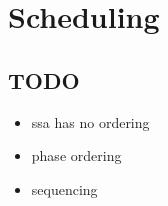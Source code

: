 \chapter{Scheduling }
\section{TODO}

\begin{itemize}
	\item ssa has no ordering
	\item phase ordering
	\item sequencing
\end{itemize}
